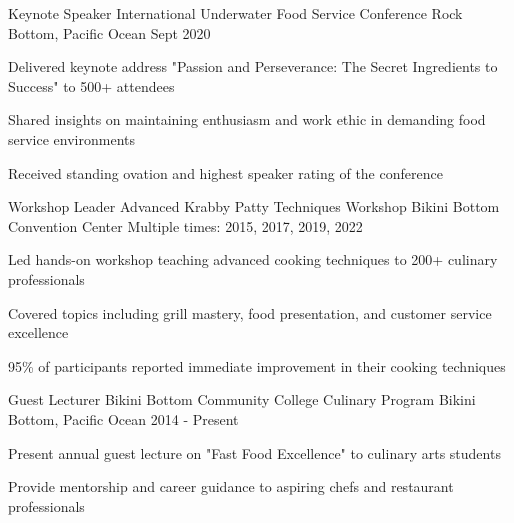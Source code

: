 \begin{cventries}

  \cventry
    {Keynote Speaker} %
    {International Underwater Food Service Conference} %
    {Rock Bottom, Pacific Ocean} %
    {Sept 2020} %
    {
      \begin{cvitems}
        \item {Delivered keynote address "Passion and Perseverance: The Secret Ingredients to Success" to 500+ attendees}
        \item {Shared insights on maintaining enthusiasm and work ethic in demanding food service environments}
        \item {Received standing ovation and highest speaker rating of the conference}
      \end{cvitems}
    }

  \cventry
    {Workshop Leader} %
    {Advanced Krabby Patty Techniques Workshop} %
    {Bikini Bottom Convention Center} %
    {Multiple times: 2015, 2017, 2019, 2022} %
    {
      \begin{cvitems}
        \item {Led hands-on workshop teaching advanced cooking techniques to 200+ culinary professionals}
        \item {Covered topics including grill mastery, food presentation, and customer service excellence}
        \item {95\% of participants reported immediate improvement in their cooking techniques}
      \end{cvitems}
    }

  \cventry
    {Guest Lecturer} %
    {Bikini Bottom Community College Culinary Program} %
    {Bikini Bottom, Pacific Ocean} %
    {2014 - Present} %
    {
      \begin{cvitems}
        \item {Present annual guest lecture on "Fast Food Excellence" to culinary arts students}
        \item {Provide mentorship and career guidance to aspiring chefs and restaurant professionals}
      \end{cvitems}
    }

\end{cventries}
